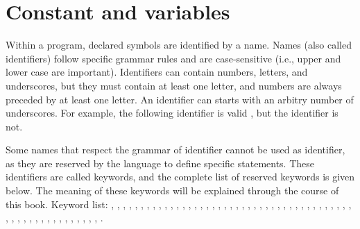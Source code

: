 \section{Constant and variables}

Within a program, declared symbols are identified by a name. Names (also called
identifiers) follow specific grammar rules and are case-sensitive (i.e., upper
and lower case are important). Identifiers can contain numbers, letters, and
underscores, but they must contain at least one letter, and numbers are always
preceded by at least one letter. An identifier can starts with an arbitry number
of underscores. For example, the following identifier is valid ,
but the identifier  is not.


Some names that respect the grammar of identifier cannot be used as identifier,
as they are reserved by the language to define specific statements. These
identifiers are called keywords, and the complete list of reserved keywords is
given below. The meaning of these keywords will be explained through the course
of this book. Keyword list: , , ,
, , , , ,
, , , , , ,
, , , , ,
, , , , ,
, , , , , ,
, , , , ,
, , , , ,
, , , , ,
, , , , ,
, , , , ,
, , .


